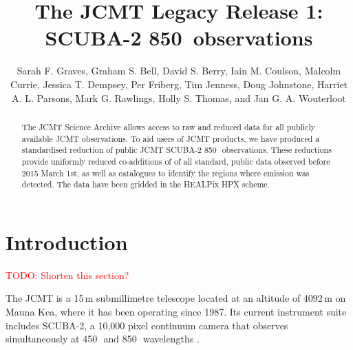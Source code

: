 \documentclass[twocolumn]{aastex6}
\newcommand{\um}{\micron}
\newcommand{\todo}[1]{\textcolor{red}{TODO: #1}}
\begin{document}
\title{The JCMT Legacy Release 1: SCUBA-2 850\micron\ observations}

\author{Sarah F. Graves,
     Graham S. Bell,
     David S. Berry,
     Iain M. Coulson,
     Malcolm Currie,
     Jessica T. Dempsey,
     Per Friberg,
     Tim Jenness,
     Doug Johnstone,
     Harriet A. L. Parsons,
     Mark G. Rawlings,
     Holly S. Thomas,
    and Jan G. A. Wouterloot
}

\begin{abstract}
  The JCMT Science Archive allows access to raw and reduced data for
  all publicly available JCMT observations. To aid users of JCMT
  products, we have produced a standardised reduction of public JCMT
  SCUBA-2 850\,\um\ observations. These reductions provide
  uniformly reduced co-additions of of all standard, public data
  observed before 2015 March 1st, as well as catalogues to identify
  the regions where emission was detected. The data have been gridded
  in the HEALPix HPX scheme.
\end{abstract}


\section{Introduction}
\todo{Shorten this section?}

The JCMT is a 15\,m submillimetre telescope located at an altitude of
4092\,m on Mauna Kea, where it has been operating since
1987. Its current instrument suite includes SCUBA-2, a 10,000
pixel continuum camera that observes simultaneously at 450\,\um\ and
850\,\um\ wavelengths \citep{Holland2013}.
\end{document}

